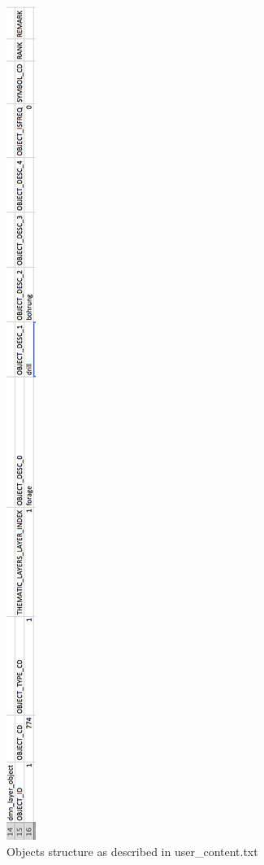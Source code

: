 \documentclass[a4paper, 12pt]{article}
\begin{document}
\begin{figure} [hbp]
  \centering
  \includegraphics[height=.9\textheight]{img/objects.png}
  \caption{Objects structure as described in user\_content.txt}
  \label{fig:objects}
\end{figure}
\end{document}
